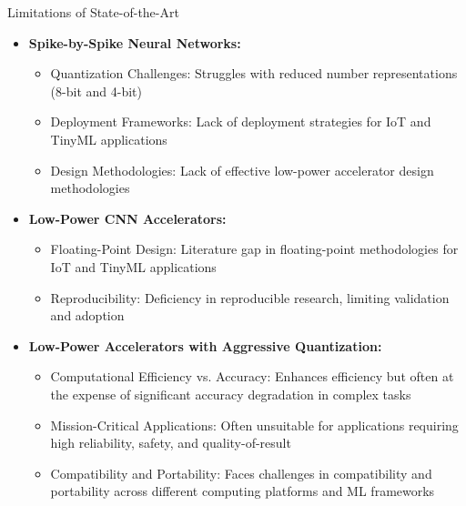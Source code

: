 \begin{frame}{Limitations of State-of-the-Art}
	\begin{itemize}
		\item<1-> \textbf{Spike-by-Spike Neural Networks:}
		\begin{itemize}
			\item<2-> \alert{Quantization Challenges:} Struggles with reduced number representations (8-bit and 4-bit)
			\item<3-> \alert{Deployment Frameworks:} Lack of deployment strategies for IoT and TinyML applications
			\item<4-> \alert{Design Methodologies:} Lack of effective low-power accelerator design methodologies
		\end{itemize}
		\item<5-> \textbf{Low-Power CNN Accelerators:}
		\begin{itemize}
			\item<6-> \alert{Floating-Point Design:} Literature gap in floating-point methodologies for IoT and TinyML applications
			\item<7-> \alert{Reproducibility:} Deficiency in reproducible research, limiting validation and adoption
		\end{itemize}
		\item<8-> \textbf{Low-Power Accelerators with Aggressive Quantization:}
		\begin{itemize}
			\item<9-> \alert{Computational Efficiency vs. Accuracy:} Enhances efficiency but often at the expense of significant accuracy degradation in complex tasks
			\item<10-> \alert{Mission-Critical Applications:} Often unsuitable for applications requiring high reliability, safety, and quality-of-result
			\item<11-> \alert{Compatibility and Portability:} Faces challenges in compatibility and portability across different computing platforms and ML frameworks
		\end{itemize}
	\end{itemize}
\end{frame}


